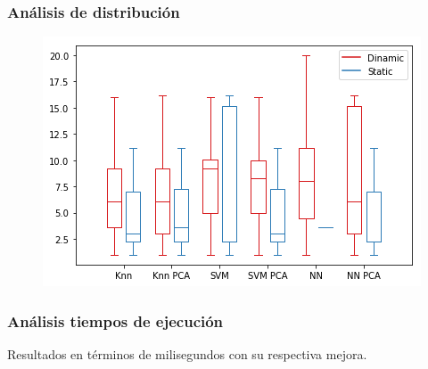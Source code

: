\documentclass[mathserif]{beamer}
\begin{document}
\begin{frame}
\frametitle{Análisis de distribución}

\begin{figure}
\includegraphics[width=\textwidth]{../figures/boxplot.png}
\end{figure}

\end{frame}

\begin{frame}
\frametitle{Análisis tiempos de ejecución}

Resultados en términos de milisegundos con su respectiva mejora.

\begin{table}[ht!]
\centering
{}
\end{table}

\end{frame}

\end{document}
